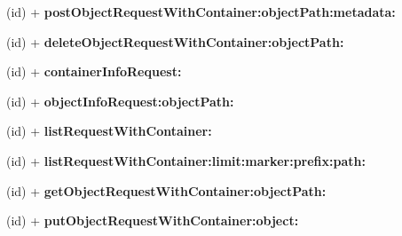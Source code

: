 \begin{DoxyCompactItemize}
\item 
\hypertarget{interface_a_s_i_cloud_files_object_request_a594d1d7c8fc812dc9acc2c862809b603}{
(id) + {\bfseries post\-Object\-Request\-With\-Container\-:object\-Path\-:metadata\-:}}
\label{interface_a_s_i_cloud_files_object_request_a594d1d7c8fc812dc9acc2c862809b603}

\item 
\hypertarget{interface_a_s_i_cloud_files_object_request_a55f1c9c4f71e7e3314b23d144b96fbac}{
(id) + {\bfseries delete\-Object\-Request\-With\-Container\-:object\-Path\-:}}
\label{interface_a_s_i_cloud_files_object_request_a55f1c9c4f71e7e3314b23d144b96fbac}

\item 
\hypertarget{interface_a_s_i_cloud_files_object_request_ab9af59ae6c15be52c702e45fca805db9}{
(id) + {\bfseries container\-Info\-Request\-:}}
\label{interface_a_s_i_cloud_files_object_request_ab9af59ae6c15be52c702e45fca805db9}

\item 
\hypertarget{interface_a_s_i_cloud_files_object_request_a4b4f0ea695cdec431818f4ca24a8a1cf}{
(id) + {\bfseries object\-Info\-Request\-:object\-Path\-:}}
\label{interface_a_s_i_cloud_files_object_request_a4b4f0ea695cdec431818f4ca24a8a1cf}

\item 
\hypertarget{interface_a_s_i_cloud_files_object_request_ad140f7f65fef97218ff5a8853afbc0c7}{
(id) + {\bfseries list\-Request\-With\-Container\-:}}
\label{interface_a_s_i_cloud_files_object_request_ad140f7f65fef97218ff5a8853afbc0c7}

\item 
\hypertarget{interface_a_s_i_cloud_files_object_request_a67e5f2848052dcdf80aac2ffd4f64525}{
(id) + {\bfseries list\-Request\-With\-Container\-:limit\-:marker\-:prefix\-:path\-:}}
\label{interface_a_s_i_cloud_files_object_request_a67e5f2848052dcdf80aac2ffd4f64525}

\item 
\hypertarget{interface_a_s_i_cloud_files_object_request_ac41ac1686f40dd0b25f473b95de56a2b}{
(id) + {\bfseries get\-Object\-Request\-With\-Container\-:object\-Path\-:}}
\label{interface_a_s_i_cloud_files_object_request_ac41ac1686f40dd0b25f473b95de56a2b}

\item 
\hypertarget{interface_a_s_i_cloud_files_object_request_ac9c57b5595d42ea6fdb13b9baa5ad073}{
(id) + {\bfseries put\-Object\-Request\-With\-Container\-:object\-:}}
\label{interface_a_s_i_cloud_files_object_request_ac9c57b5595d42ea6fdb13b9baa5ad073}


\end{DoxyCompactItemize}

